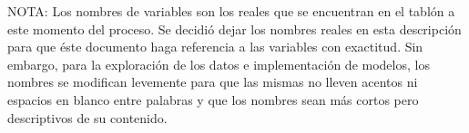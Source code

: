 NOTA: Los nombres de variables son los reales que se encuentran en el tablón a este momento del proceso. Se decidió dejar los nombres reales en esta descripción para que éste documento haga referencia a las variables con exactitud. Sin embargo, para la exploración de los datos e implementación de modelos, los nombres se modifican levemente para que las mismas no lleven acentos ni espacios en blanco entre palabras y que los nombres sean más cortos pero descriptivos de su contenido.
